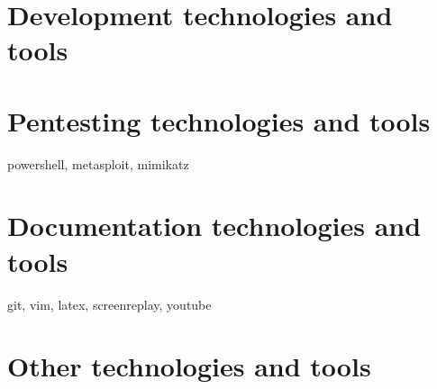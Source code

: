 \section{Development technologies and tools}
\section{Pentesting technologies and tools}
powershell, metasploit, mimikatz
\section{Documentation technologies and tools}
git, vim, latex, screenreplay, youtube
\section{Other technologies and tools}
